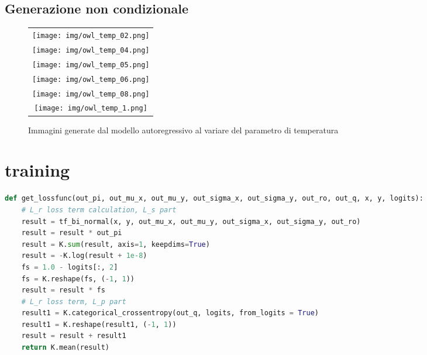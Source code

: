 \subsection{Generazione non condizionale} %
\label{sub:generazione_non_condizionale}
\begin{figure}[ht]
	\centering
	\begin{tabular}{c}
		\texttt{[image: img/owl\_temp\_02.png]} \\
		\texttt{[image: img/owl\_temp\_04.png]} \\
		\texttt{[image: img/owl\_temp\_05.png]} \\
		\texttt{[image: img/owl\_temp\_06.png]} \\
		\texttt{[image: img/owl\_temp\_08.png]} \\
		\texttt{[image: img/owl\_temp\_1.png]}
	\end{tabular}
	\caption{Immagini generate dal modello autoregressivo al variare del parametro di temperatura}
\end{figure}

\section{training} %
\label{sec:training}
\begin{minipage}{\linewidth}
\begin{lstlisting}[language = Python, frame = single, caption = {Implementazione in Keras del calcolo dell'errore di ricostruzione, suddiviso fra i termini dell'errore nell'offset $(L_s)$ e l'errore degli stati della penna $(L_p)$}, captionpos = b]
def get_lossfunc(out_pi, out_mu_x, out_mu_y, out_sigma_x, out_sigma_y, out_ro, out_q, x, y, logits):
    # L_r loss term calculation, L_s part
    result = tf_bi_normal(x, y, out_mu_x, out_mu_y, out_sigma_x, out_sigma_y, out_ro)
    result = result * out_pi
    result = K.sum(result, axis=1, keepdims=True)
    result = -K.log(result + 1e-8)
    fs = 1.0 - logits[:, 2]
    fs = K.reshape(fs, (-1, 1))
    result = result * fs
    # L_r loss term, L_p part
    result1 = K.categorical_crossentropy(out_q, logits, from_logits = True)
    result1 = K.reshape(result1, (-1, 1))
    result = result + result1
    return K.mean(result)
\end{lstlisting}
\end{minipage}

\begin{minipage}{\linewidth}
\begin{lstlisting}[language = Python, frame = single, caption = {}, captionpos = b]

\end{lstlisting}
\end{minipage}